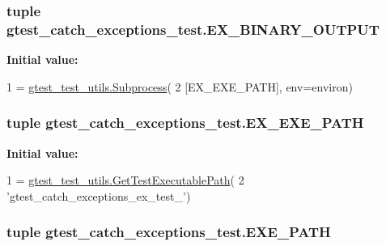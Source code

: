\hypertarget{namespacegtest__catch__exceptions__test_a890b7d8de84d44cf4cd776663654489a}{
\subsubsection[{E\-X\-\_\-\-B\-I\-N\-A\-R\-Y\-\_\-\-O\-U\-T\-P\-U\-T}]{\setlength{\rightskip}{0pt plus 5cm}tuple gtest\-\_\-catch\-\_\-exceptions\-\_\-test.\-E\-X\-\_\-\-B\-I\-N\-A\-R\-Y\-\_\-\-O\-U\-T\-P\-U\-T}}\label{namespacegtest__catch__exceptions__test_a890b7d8de84d44cf4cd776663654489a}
{\bfseries Initial value\-:}
\begin{DoxyCode}
1 = \hyperlink{classgtest__test__utils_1_1_subprocess}{gtest\_test\_utils.Subprocess}(
2     [EX\_EXE\_PATH], env=environ)
\end{DoxyCode}
\hypertarget{namespacegtest__catch__exceptions__test_a4789e6b786fb431c8f4e205ac93782b5}{
\subsubsection[{E\-X\-\_\-\-E\-X\-E\-\_\-\-P\-A\-T\-H}]{\setlength{\rightskip}{0pt plus 5cm}tuple gtest\-\_\-catch\-\_\-exceptions\-\_\-test.\-E\-X\-\_\-\-E\-X\-E\-\_\-\-P\-A\-T\-H}}\label{namespacegtest__catch__exceptions__test_a4789e6b786fb431c8f4e205ac93782b5}
{\bfseries Initial value\-:}
\begin{DoxyCode}
1 = \hyperlink{namespacegtest__test__utils_a1bdf3cac86afa675ed37629b183048e9}{gtest\_test\_utils.GetTestExecutablePath}(
2     \textcolor{stringliteral}{'gtest\_catch\_exceptions\_ex\_test\_'})
\end{DoxyCode}
\hypertarget{namespacegtest__catch__exceptions__test_a9176972ff83182f11532cbbc27f5cb42}{
\subsubsection[{E\-X\-E\-\_\-\-P\-A\-T\-H}]{\setlength{\rightskip}{0pt plus 5cm}tuple gtest\-\_\-catch\-\_\-exceptions\-\_\-test.\-E\-X\-E\-\_\-\-P\-A\-T\-H}}\label{namespacegtest__catch__exceptions__test_a9176972ff83182f11532cbbc27f5cb42}
